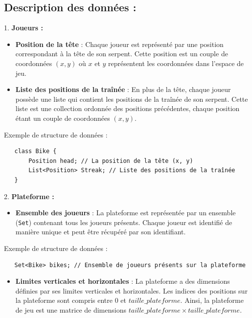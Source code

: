 \documentclass[a4paper,12pt]{article}
\begin{document}
    \subsection{Description des données :}
1.      \textbf{Joueurs :}
        \begin{itemize}
            \item \textbf{Position de la tête} : Chaque joueur est représenté par une position correspondant à la tête de son serpent. Cette position est un couple de coordonnées $(x, y)$ où $x$ et $y$ représentent les coordonnées dans l'espace de jeu.
            \item \textbf{Liste des positions de la traînée} : En plus de la tête, chaque joueur possède une liste qui contient les positions de la traînée de son serpent. Cette liste est une collection ordonnée des positions précédentes, chaque position étant un couple de coordonnées $(x, y)$.
         \end{itemize}
   
   Exemple de structure de données :
   \begin{verbatim}
   class Bike {
       Position head; // La position de la tête (x, y)
       List<Position> Streak; // Liste des positions de la traînée
   }
   \end{verbatim}

2. \textbf{Plateforme :}
   \begin{itemize}
       \item \textbf{Ensemble des joueurs} : La plateforme est représentée par un ensemble (\texttt{Set}) contenant tous les joueurs présents. Chaque joueur est identifié de manière unique et peut être récupéré par son identifiant.
   \end{itemize}

   Exemple de structure de données :
   \begin{verbatim}
   Set<Bike> bikes; // Ensemble de joueurs présents sur la plateforme
   \end{verbatim}

   \begin{itemize}
       \item \textbf{Limites verticales et horizontales} : La plateforme a des dimensions définies par ses limites verticales et horizontales. Les indices des positions sur la plateforme sont compris entre $0$ et $taille\_plateforme$. Ainsi, la plateforme de jeu est une matrice de dimensions $taille\_plateforme \times taille\_plateforme$.
   \end{itemize}
\end{document}
